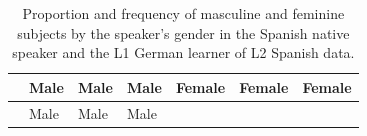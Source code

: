 \documentclass[
  letterpaper,
  DIV=11,
  numbers=noendperiod]{scrartcl}
\begin{document}
\begin{longtable}[]{@{}
  >{\raggedright\arraybackslash}p{}
  >{\centering\arraybackslash}p{}
  >{\centering\arraybackslash}p{}
  >{\centering\arraybackslash}p{}
  >{\centering\arraybackslash}p{}
  >{\centering\arraybackslash}p{}
  >{\centering\arraybackslash}p{}@{}}
\caption{Proportion and frequency of masculine and feminine subjects by
the speaker's gender in the Spanish native speaker and the L1 German
learner of L2 Spanish
data.}\label{tbl-SpeakerGender-L1Engl}\tabularnewline
\toprule\noalign{}
\begin{minipage}[b]{\linewidth}\raggedright
\end{minipage} & \begin{minipage}[b]{\linewidth}\centering
Male
\end{minipage} & \begin{minipage}[b]{\linewidth}\centering
Male
\end{minipage} & \begin{minipage}[b]{\linewidth}\centering
Male
\end{minipage} & \begin{minipage}[b]{\linewidth}\centering
Female
\end{minipage} & \begin{minipage}[b]{\linewidth}\centering
Female
\end{minipage} & \begin{minipage}[b]{\linewidth}\centering
Female
\end{minipage} \\
\midrule\noalign{}
\endfirsthead
\toprule\noalign{}
\begin{minipage}[b]{\linewidth}\raggedright
\end{minipage} & \begin{minipage}[b]{\linewidth}\centering
Male
\end{minipage} & \begin{minipage}[b]{\linewidth}\centering
Male
\end{minipage} & \begin{minipage}[b]{\linewidth}\centering
Male
\end{minipage} & \begin{minipage}[b]{\linewidth}\centering

\end{minipage}
\end{longtable}
\end{document}
